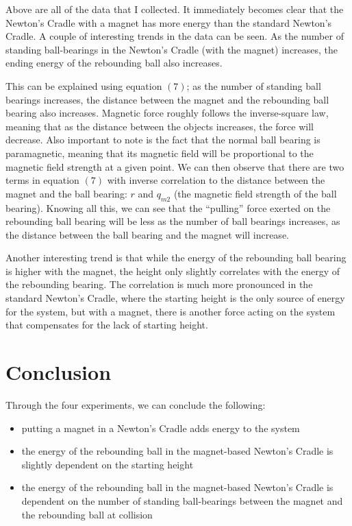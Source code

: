\documentclass[aip,jmp,amsmath,amssymb,reprint,author-numerical]{revtex4-1}
\begin{document}
        Above are all of the data that I collected. It immediately becomes clear that the Newton's
        Cradle with a magnet has more energy than the standard Newton's Cradle.  A couple of
        interesting trends in the data can be seen. As the number of standing ball-bearings in the
        Newton's Cradle (with the magnet) increases, the ending energy of the rebounding ball also
        increases.

        This can be explained using equation $(7)$; as the number of standing ball bearings increases,
        the distance between the magnet and the rebounding ball bearing also increases. Magnetic force
        roughly follows the inverse-square law, meaning that as the distance between the objects
        increases, the force will decrease. Also important to note is the fact that the normal ball
        bearing is paramagnetic, meaning that its magnetic field will be proportional to the magnetic
        field strength at a given point. We can then observe that there are two terms in equation $(7)$
        with inverse correlation to the distance between the magnet and the ball bearing: $r$ and
        $q_{m2}$ (the magnetic field strength of the ball bearing). Knowing all this, we can see that
        the ``pulling'' force exerted on the rebounding ball bearing will be less as the number of
        ball bearings increases, as the distance between the ball bearing and the magnet will increase.

        Another interesting trend is that while the energy of the rebounding ball bearing is higher with
        the magnet, the height only slightly correlates with the energy of the rebounding bearing.
        The correlation is much more pronounced in the standard Newton's Cradle, where the starting
        height is the only source of energy for the system, but with a magnet, there is another force
        acting on the system that compensates for the lack of starting height.


    \section{\label{sec:concl}Conclusion}

        Through the four experiments, we can conclude the following:

        \begin{itemize}
            \item putting a magnet in a Newton's Cradle adds energy to the system
            \item the energy of the rebounding ball in the magnet-based Newton's Cradle is slightly
                dependent on the starting height
            \item the energy of the rebounding ball in the magnet-based Newton's Cradle is dependent
                on the number of standing ball-bearings between the magnet and the rebounding ball at
                collision
        \end{itemize}
\end{document}
